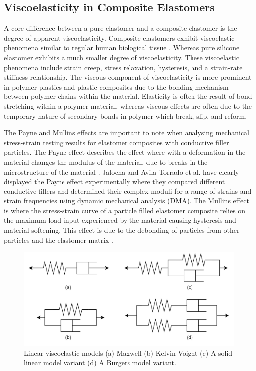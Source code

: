 \subsection{Viscoelasticity in Composite Elastomers}
A core difference between a pure elastomer and a composite elastomer is the degree of apparent viscoelasticity. Composite elastomers exhibit viscoelastic phenomena \cite{Ligia2009} similar to regular human biological tissue \cite{Fung1993}. Whereas pure silicone elastomer exhibits a much smaller degree of viscoelasticity. These viscoelastic phenomena include strain creep, stress relaxation, hysteresis, and a strain-rate stiffness relationship. The viscous component of viscoelasticity is more prominent in polymer plastics and plastic composites due to the bonding mechanism between polymer chains within the material. Elasticity is often the result of bond stretching within a polymer material, whereas  viscous effects are often due to the temporary nature of secondary bonds in polymer which break, slip, and reform. %

The Payne and Mullins effects are important to note when analysing mechanical stress-strain testing results for elastomer composites with conductive filler particles. The Payne effect describes the effect where with a deformation in the material changes the modulus of the material, due to breaks in the microstructure of the material \cite{Payne1972}. Jalocha \cite{Jalocha2020} and Avila-Torrado et al. \cite{AvilaTorrado2022} have clearly displayed the Payne effect experimentally where they compared different conductive fillers and determined their complex moduli for a range of strains and strain frequencies using dynamic mechanical analysis (DMA). The Mullins effect is where the stress-strain curve of a particle filled elastomer composite relies on the maximum load input experienced by the material causing hysteresis and material softening. This effect is due to the debonding of particles from other particles and the elastomer matrix \cite{Mullins1969}.

\begin{figure}[H]
	\centering
	\includegraphics[width=0.6\linewidth]{Figures/viscoelastic_models.jpg}
	\caption{Linear viscoelastic models (a) Maxwell (b) Kelvin-Voight (c) A solid linear model variant (d) A Burgers model variant.}
	\label{fig:linear_viscoelastic_eg}
\end{figure}

